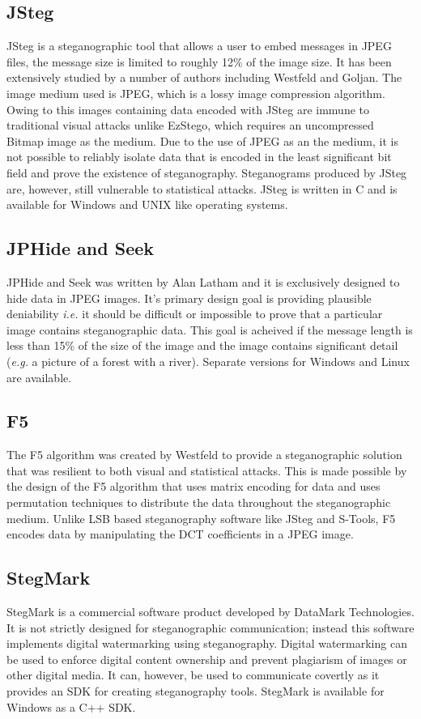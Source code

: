 \subsection{JSteg} 
JSteg \cite{jsteg} is a steganographic tool that allows a user to embed messages in JPEG files, the message size is limited to roughly 12\% of the image size. It has been extensively studied by a number of authors including Westfeld and Goljan. The image medium used is JPEG, which is a lossy image compression algorithm. Owing to this images containing data encoded with JSteg are immune to traditional visual attacks unlike EzStego, which requires an uncompressed Bitmap image as the medium. Due to the use of JPEG as an the medium, it is not possible to reliably isolate data that is encoded in the least significant bit field and prove the existence of steganography. Steganograms produced by JSteg are, however, still vulnerable to statistical attacks. JSteg is written in C and is available for Windows and UNIX like operating systems.
\subsection{JPHide and Seek}
JPHide and Seek \cite{jphide} was written by Alan Latham and it is exclusively designed to hide data in JPEG images. It's primary design goal is providing plausible deniability \emph{i.e.} it should be difficult or impossible to prove that a particular image contains steganographic data. This goal is acheived if the message length is less than 15\% of the size of the image and the image contains significant detail (\emph{e.g.} a picture of a forest with a river). Separate versions for Windows and Linux are available.
 \subsection{F5}
 The F5 algorithm \cite{westfeld2001f5} was created by Westfeld to provide a steganographic solution that was resilient to both visual and statistical attacks. This is made possible by the design of the F5 algorithm that uses matrix encoding for data and uses permutation techniques to distribute the data throughout the steganographic medium. Unlike LSB based steganography software like JSteg and S-Tools, F5 encodes data by manipulating the DCT coefficients in a JPEG image. 
 \subsection{StegMark}
 StegMark \cite{stegmark} is a commercial software product developed by DataMark Technologies. It is not strictly designed for steganographic communication; instead this software implements digital watermarking using steganography. Digital watermarking can be used to enforce digital content ownership and prevent plagiarism of images or other digital media. It can, however, be used to communicate covertly as it provides an SDK for creating steganography tools. StegMark is available for Windows as a C++ SDK.

